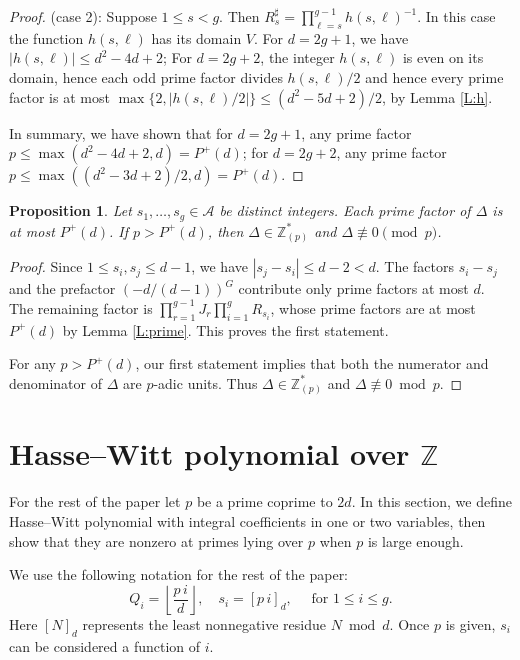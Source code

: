 \documentclass{amsart}
\theoremstyle{plain}
\newtheorem{prop}[theorem]{Proposition}
\theoremstyle{remark}
\theoremstyle{remark}
\newcommand{\cA}{\mathcal{A}}
\newcommand{\pfloor}[1]{\left\lfloor #1 \right\rfloor}
\newcommand{\0}{\mathbf{0}}
\newcommand{\1}{\mathbf{1}}
\newcommand{\Z}{\mathbb{Z}}
\newcommand{\Rsd}{R_s^{\sharp}}
\begin{document}
\begin{proof}
\noindent
(case 2): Suppose $1\le s<g$. 
Then 
$
\Rsd =\prod_{\ell=s}^{g-1}h(s,\ell)^{-1}.
$ 
In this case the function $h(s,\ell)$ has its domain $V$.
For $d=2g+1$, we have $|h(s,\ell)|\le d^2-4d+2$;
For $d=2g+2$, the integer $h(s,\ell)$ is even on its domain,
hence each odd prime factor divides $h(s,\ell)/2$ and hence
every prime factor is at most 
$\max\{2,|h(s,\ell)/2|\}\le (d^2-5d+2)/2$, by Lemma \ref{L:h}.

In summary, we have shown that for $d=2g+1$, any prime factor 
$p\le \max(d^2-4d+2,d)=P^+(d)$; for $d=2g+2$, 
any prime factor $p\le \max((d^2-3d+2)/2,d)=P^+(d)$.
\end{proof}


\begin{prop}\label{P:determinant} 
Let $s_1,\ldots,s_g\in \cA$ be distinct integers.
Each prime factor of $\Delta$ is at most $P^+(d)$.
If $p>P^+(d)$, then $\Delta\in\Z^*_{(p)}$ and 
$\Delta \not\equiv 0\pmod p$. 
\end{prop}

\begin{proof}
Since $1\le s_i,s_j\le d-1$, we have $|s_j-s_i|\le d-2<d.$ 
The factors $s_i-s_j$ and the prefactor $(-d/(d-1))^G$ contribute only prime factors at most $d$.
The remaining factor is
$\prod_{r=1}^{g-1}J_r\prod_{i=1}^gR_{s_i}$, whose prime 
factors
are at most $P^+(d)$ by Lemma \ref{L:prime}.
This proves the first statement.

For any $p>P^+(d)$, our first statement
implies that both the numerator and denominator of $\Delta$
are $p$-adic units.
Thus $\Delta\in\Z_{(p)}^*$ and  $\Delta\not\equiv 0\bmod p$.
\end{proof}


\section{Hasse--Witt polynomial over $\Z$}

For the rest of the paper let $p$ be a prime coprime to $2d$. 
In this section, we define Hasse--Witt polynomial with integral coefficients in one or two variables, then show that they are nonzero 
at primes lying over $p$ when $p$ is large enough. 

We use 
the following notation for the rest of the paper:
$$Q_i=\pfloor{\frac{p\,i}{d}}, \quad s_i=[p\,i]_d, \quad \mbox{  for $1\le i\le g$}.$$
Here $[N]_d$ represents the least nonnegative residue $N\bmod d$.
Once $p$ is given, $s_i$ can be considered a function of $i$.
\end{document}
